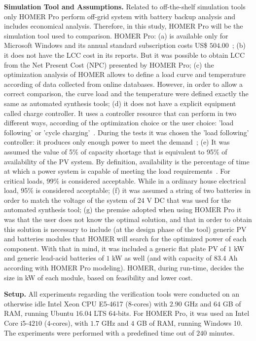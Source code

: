 \documentclass[runningheads]{llncs}
\begin{document}
\textbf{Simulation Tool and Assumptions.} Related to off-the-shelf simulation tools only HOMER Pro perform off-grid system with battery backup analysis and includes economical analysis. Therefore, in this study, HOMER Pro will be the simulation tool used to comparison.  HOMER Pro: (a) is available only for Microsoft Windows and its annual standard subscription costs US\$ $504.00$~\cite{HOMER}; (b) it does not have the LCC cost in its reports. But it was possible to obtain LCC from the Net Present Cost (NPC) presented by HOMER Pro; (c) the optimization analysis of HOMER allows to define a load curve and temperature according of data collected from online databases. However, in order to allow a correct comparison, the curve load and the temperature were defined exactly the same as automated synthesis tools; (d) it does not have a explicit equipment called charge controller. It uses a controller resource that can perform in two different ways, according of the optimization choice or the user choice: 'load following' or 'cycle charging'~\cite{HOMER}. During the tests it was chosen the 'load following' controller: it produces only enough power to meet the demand~\cite{HOMER}; (e) It was assumed the value of 5\% of capacity shortage that is equivalent to 95\% of availability of the PV system. By definition, availability is the percentage of time at which a power system is capable of meeting the load requirements~\cite{Khatib2014}. For critical loads, 99\% is considered acceptable. While in a ordinary house electrical load, 95\% is considered acceptable; (f) it was assumed a string of two batteries in order to match the voltage of the system of $24$ V DC that was used for the automated synthesis tool; (g) the premise adopted when using HOMER Pro it was that the user does not know the optimal solution, and that in order to obtain this solution is necessary to include (at the design phase of the tool) generic PV and batteries modules that HOMER will search for the optimized power of each component. With that in mind, it was included a generic flat plate PV of $1$ kW and generic lead-acid batteries of $1$ kW as well (and with capacity of $83.4$ Ah according with HOMER Pro modeling). HOMER, during run-time, decides the size in kW of each module, based on feasibility and lower cost.

\textbf{Setup.} All experiments regarding the verification tools were conducted on an otherwise idle Intel Xeon CPU E5-4617 ($8$-cores) with $2.90$ GHz and $64$ GB of RAM, running Ubuntu $16.04$ LTS $64$-bits. For HOMER Pro, it was used an Intel Core i5-$4210$ ($4$-cores), with $1.7$ GHz and $4$ GB of RAM, running Windows 10. The experiments were performed with a predefined time out of $240$ minutes.
\end{document}
